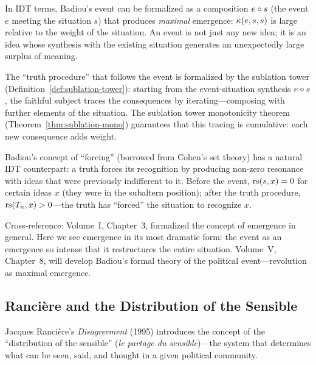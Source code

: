 \begin{interpretation}
In IDT terms, Badiou's event can be formalized as a composition
$e \circ s$ (the event $e$ meeting the situation $s$) that produces
\emph{maximal} emergence: $\kappa(e, s, s)$ is large relative to the
weight of the situation. An event is not just any new idea; it is an idea
whose synthesis with the existing situation generates an unexpectedly large
surplus of meaning.

The ``truth procedure'' that follows the event is formalized by the
sublation tower (Definition~\ref{def:sublation-tower}): starting from the
event-situation synthesis $e \circ s$, the faithful subject traces the
consequences by iterating---composing with further elements of the situation.
The sublation tower monotonicity theorem (Theorem~\ref{thm:sublation-mono})
guarantees that this tracing is cumulative: each new consequence adds weight.

Badiou's concept of ``forcing'' (borrowed from Cohen's set theory) has a
natural IDT counterpart: a truth forces its recognition by producing
non-zero resonance with ideas that were previously indifferent to it.
Before the event, $\mathrm{rs}(s, x) = 0$ for certain ideas $x$ (they were in
the subaltern position); after the truth procedure, $\mathrm{rs}(T_n, x) > 0$---the
truth has ``forced'' the situation to recognize $x$.

Cross-reference: Volume~I, Chapter~3, formalized the concept of emergence
in general. Here we see emergence in its most dramatic form: the event as
an emergence so intense that it restructures the entire situation.
Volume~V, Chapter~8, will develop Badiou's formal theory of the political
event---revolution as maximal emergence.
\end{interpretation}

\subsection{Rancière and the Distribution of the Sensible}

Jacques Rancière's \textit{Disagreement} (1995) introduces the concept of
the ``distribution of the sensible'' (\textit{le partage du sensible})---the
system that determines what can be seen, said, and thought in a given
political community.

